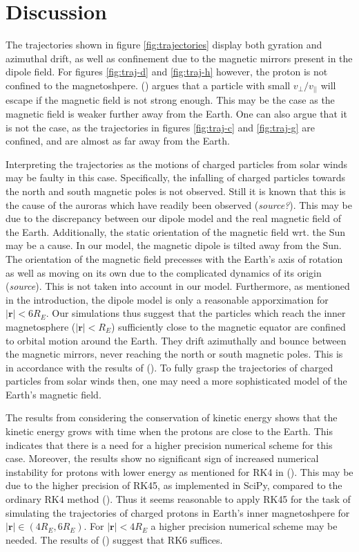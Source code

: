 \section{Discussion}
The trajectories shown in figure \ref{fig:trajectories} display both gyration and azimuthal drift, as well as confinement due to the magnetic mirrors present in the dipole field.
For figures \ref{fig:traj-d} and \ref{fig:traj-h} however, the proton is not confined to the magnetoshpere.
(\cite{chen_2015}) argues that a particle with small $v_\perp / v_{||}$ will escape if the magnetic field is not strong enough. 
This may be the case as the magnetic field is weaker further away from the Earth. 
One can also argue that it is not the case, as the trajectories in figures \ref{fig:traj-c} and \ref{fig:traj-g} are confined, and are almost as far away from the Earth.


Interpreting the trajectories as the motions of charged particles from solar winds may be faulty in this case. 
Specifically, the infalling of charged particles towards the north and south magnetic poles is not observed. 
Still it is known that this is the cause of the auroras which have readily been observed (\textit{source?}). 
This may be due to the discrepancy between our dipole model and the real magnetic field of the Earth.
Additionally, the static orientation of the magnetic field wrt. the Sun may be a cause. 
In our model, the magnetic dipole is tilted away from the Sun.
The orientation of the magnetic field precesses with the Earth's axis of rotation as well as moving on its own due to the complicated dynamics of its origin (\textit{source}).
This is not taken into account in our model. 
Furthermore, as mentioned in the introduction, the dipole model is only a reasonable apporximation for $|\bm{r}| < 6R_E$.
Our simulations thus suggest that the particles which reach the inner magnetosphere ($|\bm{r}| < R_E$) sufficiently close to the magnetic equator are confined to orbital motion around the Earth.
They drift azimuthally and bounce between the magnetic mirrors, never reaching the north or south magnetic poles. 
This is in accordance with the results of (\cite{soni_2021}).
To fully grasp the trajectories of charged particles from solar winds then, one may need a more sophisticated model of the Earth's magnetic field.

The results from considering the conservation of kinetic energy shows that the kinetic energy grows with time when the protons are close to the Earth. 
This indicates that there is a need for a higher precision numerical scheme for this case.
Moreover, the results show no significant sign of increased numerical instability for protons with lower energy as mentioned for RK4 in (\cite{soni_2021}). 
This may be due to the higher precision of RK45, as implemented in SciPy, compared to the ordinary RK4 method (\cite{DORMAND198019}).
Thus it seems reasonable to apply RK45 for the task of simulating the trajectories of charged protons in Earth's inner magnetoshpere for $|\bm{r}| \in (4R_E, 6R_E)$.
For $|\bm{r}|<4R_E$ a higher precision numerical scheme may be needed. 
The results of (\cite{soni_2021}) suggest that RK6 suffices.    

